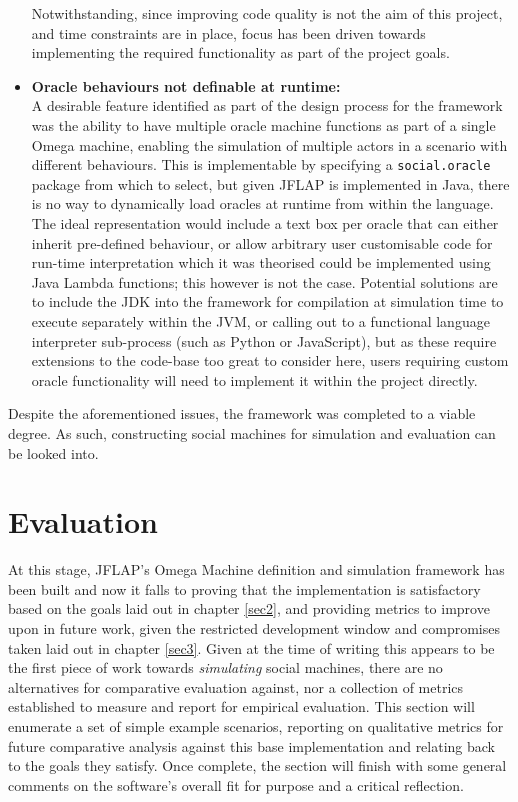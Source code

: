 \documentclass[12pt]{article}
\newcommand{\xmark}{\ding{55}}
\begin{document}
\begin{itemize}
				Notwithstanding, since improving code quality is not the aim of this project, and time constraints are in place, focus has been driven towards implementing the required functionality as part of the project goals.
			\item[\xmark] \textbf{Oracle behaviours not definable at runtime:\\}
				A desirable feature identified as part of the design process for the framework was the ability to have multiple oracle machine functions as part of a single Omega machine, enabling the simulation of multiple actors in a scenario with different behaviours.
				This is implementable by specifying a \texttt{social.oracle} package from which to select, but given JFLAP is implemented in Java, there is no way to dynamically load oracles at runtime from within the language.
				The ideal representation would include a text box per oracle that can either inherit pre-defined behaviour, or allow arbitrary user customisable code for run-time interpretation which it was theorised could be implemented using Java Lambda functions; this however is not the case.
				Potential solutions are to include the JDK into the framework for compilation at simulation time to execute separately within the JVM, or calling out to a functional language interpreter sub-process (such as Python or JavaScript), but as these require extensions to the code-base too great to consider here, users requiring custom oracle functionality will need to implement it within the project directly.
		\end{itemize}
			Despite the aforementioned issues, the framework was completed to a viable degree. 
			As such, constructing social machines for simulation and evaluation can be looked into.
		
	\clearpage\section{Evaluation}\label{sec5}
		At this stage, JFLAP's Omega Machine definition and simulation framework has been built and now it falls to proving that the implementation is satisfactory based on the goals laid out in chapter \ref{sec2}, and providing metrics to improve upon in future work, given the restricted development window and compromises taken laid out in chapter \ref{sec3}.
		Given at the time of writing this appears to be the first piece of work towards \textit{simulating} social machines, there are no alternatives for comparative evaluation against, nor a collection of metrics established to measure and report for empirical evaluation.
		This section will enumerate a set of simple example scenarios, reporting on qualitative metrics for future comparative analysis against this base implementation and relating back to the goals they satisfy.
		Once complete, the section will finish with some general comments on the software's overall fit for purpose and a critical reflection.
	
\end{document}
